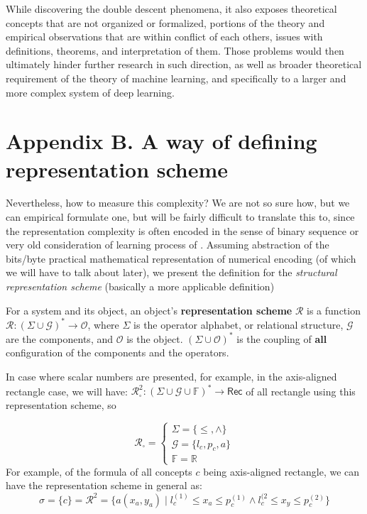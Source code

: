 \documentclass[10pt]{article} %
\begin{document}
While discovering the double descent phenomena, it also exposes theoretical concepts that are not organized or formalized, portions of the theory and empirical observations that are within conflict of each others, issues with definitions, theorems, and interpretation of them. Those problems would then ultimately hinder further research in such direction, as well as broader theoretical requirement of the theory of machine learning, and specifically to a larger and more complex system of deep learning. 

\section*{Appendix B. A way of defining representation scheme}

Nevertheless, how to measure this complexity? We are not so sure how, but we can empirical formulate one, but will be fairly difficult to translate this to, since the representation complexity is often encoded in the sense of binary sequence or very old consideration of learning process of \cite{10.5555/200548}. Assuming abstraction of the bits/byte practical mathematical representation of numerical encoding (of which we will have to talk about later), we present the definition for the \textit{structural representation scheme} (basically a more applicable definition)

\begin{definition}
    For a system and its object, an object's \textbf{representation scheme} $\mathcal{R}$ is a function $\bm{\mathcal{R}}: (\Sigma\cup \mathcal{G})^{*}\to \mathcal{O}$, where $\Sigma$ is the operator alphabet, or relational structure, $\mathcal{G}$ are the components, and $\mathcal{O}$ is the object. $(\Sigma \cup \mathcal{O})^{*}$ is the coupling of \textbf{all} configuration of the components and the operators. 
\end{definition}

In case where scalar numbers are presented, for example, in the axis-aligned rectangle case, we will have: $\bm{\mathcal{R}}^{2}_{\square}:(\Sigma\cup \mathcal{G}\cup\mathbb{F})^{*}\to \mathsf{Rec}$ of all rectangle using this representation scheme, so 

\begin{equation}
    \bm{\mathcal{R}}_{\square} = \begin{cases}
        \Sigma = \{\leq, \land \}\\
        \mathcal{G} = \{l_{c}, p_{c}, a\}\\
        \mathbb{F} = \mathbb{R}
    \end{cases}
\end{equation}
For example, of the formula of all concepts $c$ being axis-aligned rectangle, we can have the representation scheme in general as: 
\begin{equation}
    \sigma = \{c\} = \bm{\mathcal{R}}^{2} = \{a(x_{a},y_{a}) \mid l_{c}^{(1)} \leq x_{a}\leq p_{c}^{(1)}\land l_{c}^{(2} \leq x_{y}\leq p_{c}^{(2)}\}
\end{equation}
\end{document}
